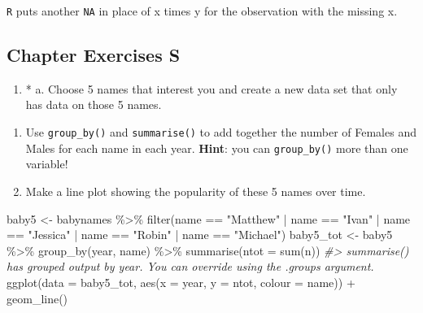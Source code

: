 \documentclass[
]{book}
\newenvironment{Shaded}{\begin{snugshade}}{\end{snugshade}}
\newcommand{\AttributeTok}[1]{\textcolor[rgb]{0.77,0.63,0.00}{#1}}
\newcommand{\CommentTok}[1]{\textcolor[rgb]{0.56,0.35,0.01}{\textit{#1}}}
\newcommand{\FunctionTok}[1]{\textcolor[rgb]{0.00,0.00,0.00}{#1}}
\newcommand{\NormalTok}[1]{#1}
\newcommand{\OtherTok}[1]{\textcolor[rgb]{0.56,0.35,0.01}{#1}}
\newcommand{\SpecialCharTok}[1]{\textcolor[rgb]{0.00,0.00,0.00}{#1}}
\newcommand{\StringTok}[1]{\textcolor[rgb]{0.31,0.60,0.02}{#1}}
\providecommand{\tightlist}{%
  \setlength{\itemsep}{0pt}\setlength{\parskip}{0pt}}
\begin{document}
\texttt{R} puts another \texttt{NA} in place of x times y for the observation with the missing x.

\hypertarget{chapexercise-3-S}{%
\subsection{Chapter Exercises S}\label{chapexercise-3-S}}

\begin{enumerate}
\def\labelenumi{\arabic{enumi}.}
\setcounter{enumi}{1}
\tightlist
\item
  * a. Choose 5 names that interest you and create a new data set that only has data on those 5 names.
\end{enumerate}

\begin{enumerate}
\def\labelenumi{\alph{enumi}.}
\setcounter{enumi}{1}
\item
  Use \texttt{group\_by()} and \texttt{summarise()} to add together the number of Females and Males for each name in each year. \textbf{Hint}: you can \texttt{group\_by()} more than one variable!
\item
  Make a line plot showing the popularity of these 5 names over time.
\end{enumerate}

\begin{Shaded}
\begin{Highlighting}[]
\NormalTok{baby5 }\OtherTok{\textless{}{-}}\NormalTok{ babynames }\SpecialCharTok{\%\textgreater{}\%} \FunctionTok{filter}\NormalTok{(name }\SpecialCharTok{==} \StringTok{"Matthew"} \SpecialCharTok{|}\NormalTok{ name }\SpecialCharTok{==} \StringTok{"Ivan"} \SpecialCharTok{|}
\NormalTok{                                name }\SpecialCharTok{==} \StringTok{"Jessica"} \SpecialCharTok{|}\NormalTok{ name }\SpecialCharTok{==} \StringTok{"Robin"} \SpecialCharTok{|}
\NormalTok{                                name }\SpecialCharTok{==} \StringTok{"Michael"}\NormalTok{)}
\NormalTok{baby5\_tot }\OtherTok{\textless{}{-}}\NormalTok{ baby5 }\SpecialCharTok{\%\textgreater{}\%} \FunctionTok{group\_by}\NormalTok{(year, name) }\SpecialCharTok{\%\textgreater{}\%}
  \FunctionTok{summarise}\NormalTok{(}\AttributeTok{ntot =} \FunctionTok{sum}\NormalTok{(n))}
\CommentTok{\#\textgreater{} \textasciigrave{}summarise()\textasciigrave{} has grouped output by \textquotesingle{}year\textquotesingle{}. You can override using the \textasciigrave{}.groups\textasciigrave{} argument.}
\FunctionTok{ggplot}\NormalTok{(}\AttributeTok{data =}\NormalTok{ baby5\_tot, }\FunctionTok{aes}\NormalTok{(}\AttributeTok{x =}\NormalTok{ year, }\AttributeTok{y =}\NormalTok{ ntot, }\AttributeTok{colour =}\NormalTok{ name)) }\SpecialCharTok{+}
  \FunctionTok{geom\_line}\NormalTok{()}
\end{Highlighting}
\end{Shaded}
\end{document}
